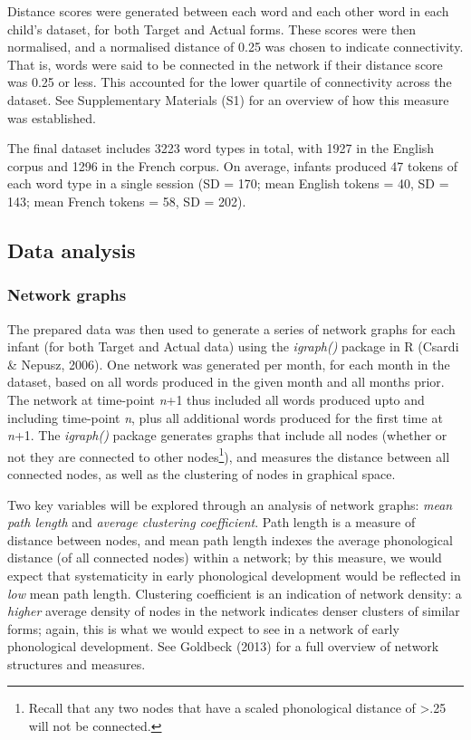 \documentclass[
  man]{apa6}
\begin{document}
Distance scores were generated between each word and each other word in each child's dataset, for both Target and Actual forms. These scores were then normalised, and a normalised distance of 0.25 was chosen to indicate connectivity. That is, words were said to be connected in the network if their distance score was 0.25 or less. This accounted for the lower quartile of connectivity across the dataset. See Supplementary Materials (S1) for an overview of how this measure was established.

The final dataset includes 3223 word types in total, with 1927 in the English corpus and 1296 in the French corpus. On average, infants produced 47 tokens of each word type in a single session (SD = 170; mean English tokens = 40, SD = 143; mean French tokens = 58, SD = 202).

\hypertarget{data-analysis}{%
\subsection{Data analysis}\label{data-analysis}}

\hypertarget{network-graphs}{%
\subsubsection{Network graphs}\label{network-graphs}}

The prepared data was then used to generate a series of network graphs for each infant (for both Target and Actual data) using the \emph{igraph()} package in R (Csardi \& Nepusz, 2006). One network was generated per month, for each month in the dataset, based on all words produced in the given month and all months prior. The network at time-point \emph{n}+1 thus included all words produced upto and including time-point \emph{n}, plus all additional words produced for the first time at \emph{n}+1. The \emph{igraph()} package generates graphs that include all nodes (whether or not they are connected to other nodes\footnote{Recall that any two nodes that have a scaled phonological distance of \textgreater.25 will not be connected.}), and measures the distance between all connected nodes, as well as the clustering of nodes in graphical space.

Two key variables will be explored through an analysis of network graphs: \emph{mean path length} and \emph{average clustering coefficient}. Path length is a measure of distance between nodes, and mean path length indexes the average phonological distance (of all connected nodes) within a network; by this measure, we would expect that systematicity in early phonological development would be reflected in \emph{low} mean path length. Clustering coefficient is an indication of network density: a \emph{higher} average density of nodes in the network indicates denser clusters of similar forms; again, this is what we would expect to see in a network of early phonological development. See Goldbeck (2013) for a full overview of network structures and measures.
\end{document}
